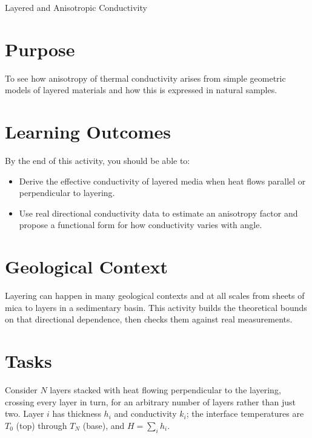 \begin{activity}{Layered and Anisotropic Conductivity}

\section*{Purpose}
To see how anisotropy of thermal conductivity arises from simple geometric models of layered materials and how this is expressed in natural samples.

\section*{Learning Outcomes}

By the end of this activity, you should be able to:
\begin{itemize}
    \item Derive the effective conductivity of layered media when heat flows parallel or perpendicular to layering.
    \item Use real directional conductivity data to estimate an anisotropy factor and propose a functional form for how conductivity varies with angle.
\end{itemize}

\section*{Geological Context}
Layering can happen in many geological contexts and at all scales from sheets of mica to layers in a sedimentary basin.   This activity builds the theoretical bounds on that directional dependence, then checks them against real measurements.

\section*{Tasks}
\begin{questions}

    Consider $N$ layers stacked with heat flowing perpendicular to the layering, crossing every layer in turn, for an arbitrary number of layers rather than just two. Layer $i$ has thickness $h_i$ and conductivity $k_i$; the interface temperatures are $T_0$ (top) through $T_N$ (base), and $H=\sum_i h_i$.

    \begin{center}
\end{center}
\end{questions}
\end{activity}

